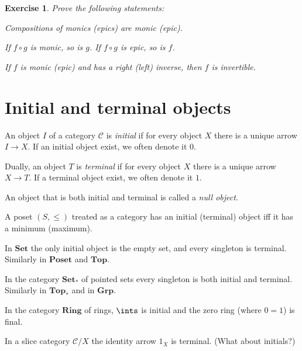 \documentclass[article, a4paper, 11pt, oneside]{memoir}
\numberwithin{equation}{chapter}
\newcommand{\cat}[1]{\mathcal{#1}}
\newcommand{\ncat}[1]{\mathbf{#1}} %
\newcommand{\catSet}{\ncat{Set}}
\newcommand{\catTop}{\ncat{Top}}
\newcommand{\catGrp}{\ncat{Grp}}
\newcommand{\catRing}{\ncat{Ring}}
\newcommand{\catPoset}{\ncat{Poset}}
\newcommand{\catC}{\cat{C}}
\theoremstyle{myexample}
\newtheorem{exercise}[theorem]{Exercise}
\theoremstyle{myexamplebreak}
\begin{document}
\begin{exercise}
    Prove the following statements:
    \begin{enumexercise}
        \item Compositions of monics (epics) are monic (epic).
        
        \item \label{ex:composition_monic_epic} If $f \circ g$ is monic, so is $g$. If $f \circ g$ is epic, so is $f$.

        \item If $f$ is monic (epic) and has a right (left) inverse, then $f$ is invertible.
    \end{enumexercise}
\end{exercise}




\chapter{Initial and terminal objects}

\newcommand{\arr}[1]{\vec{#1}}

\begin{definition}
    An object $I$ of a category $\catC$ is \emph{initial} if for every object $X$ there is a unique arrow $I \to X$. If an initial object exist, we often denote it $0$.

    Dually, an object $T$ is \emph{terminal} if for every object $X$ there is a unique arrow $X \to T$. If a terminal object exist, we often denote it $1$.

    An object that is both initial and terminal is called a \emph{null object}.
\end{definition}


\begin{examplebreak}
    \begin{enumexample}
        \item A poset $(S, \leq)$ treated as a category has an initial (terminal) object iff it has a minimum (maximum).
        
        \item In $\catSet$ the only initial object is the empty set, and every singleton is terminal. Similarly in $\catPoset$ and $\catTop$.
        
        \item In the category $\catSet_*$ of pointed sets every singleton is both initial and terminal. Similarly in $\catTop_*$ and in $\catGrp$.
        
        \item In the category $\catRing$ of rings, $\ints$ is initial and the zero ring (where $0 = 1$) is final.
        
        \item In a slice category $\catC/X$ the identity arrow $1_X$ is terminal. (What about initials?)
    \end{enumexample}
\end{examplebreak}
\end{document}
